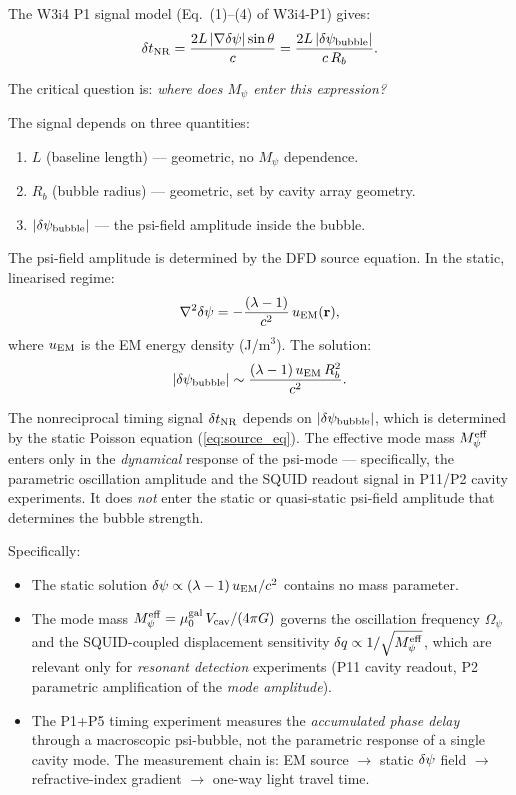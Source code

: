 The W3i4 P1 signal model (Eq.~(1)--(4) of W3i4-P1) gives:
\begin{equation}
\delta t_{\rm NR} = \frac{2L\,|\nabla\delta\psi|\sin\theta}{c}
= \frac{2L\,|\delta\psi_{\rm bubble}|}{c\,R_b}.
\label{eq:signal_recap}
\end{equation}

The critical question is: \emph{where does $M_\psi$ enter this expression?}

The signal depends on three quantities:
\begin{enumerate}[nosep]
\item $L$ (baseline length) --- geometric, no $M_\psi$ dependence.
\item $R_b$ (bubble radius) --- geometric, set by cavity array geometry.
\item $|\delta\psi_{\rm bubble}|$ --- the psi-field amplitude inside the bubble.
\end{enumerate}

The psi-field amplitude is determined by the DFD source equation. In the
static, linearised regime:
\begin{equation}
\nabla^2 \delta\psi = -\frac{(\lambda - 1)}{c^2}\,u_{\rm EM}(\mathbf{r}),
\label{eq:source_eq}
\end{equation}
where $u_{\rm EM}$ is the EM energy density (J/m$^3$). The solution:
\begin{equation}
|\delta\psi_{\rm bubble}| \sim \frac{(\lambda - 1)\,u_{\rm EM}\,R_b^2}{c^2}.
\label{eq:dpsi_from_source}
\end{equation}

\begin{theorem}
\label{thm:mpsi_absent}
The nonreciprocal timing signal $\delta t_{\rm NR}$ depends on
$|\delta\psi_{\rm bubble}|$, which is determined by the static Poisson equation
(\ref{eq:source_eq}). The effective mode mass $M_\psi^{\rm eff}$ enters only in the
\emph{dynamical} response of the psi-mode --- specifically, the parametric
oscillation amplitude and the SQUID readout signal in P11/P2 cavity
experiments. It does \emph{not} enter the static or quasi-static psi-field
amplitude that determines the bubble strength.

Specifically:
\begin{itemize}[nosep]
\item The static solution $\delta\psi \propto (\lambda-1)\,u_{\rm EM}/c^2$ contains
  no mass parameter.
\item The mode mass $M_\psi^{\rm eff} = \mu_0^{\rm gal}\,V_{\rm cav}/(4\pi G)$ governs
  the oscillation frequency $\Omega_\psi$ and the SQUID-coupled displacement
  sensitivity $\delta q \propto 1/\sqrt{M_\psi^{\rm eff}}$, which are relevant only
  for \emph{resonant detection} experiments (P11 cavity readout, P2
  parametric amplification of the \emph{mode amplitude}).
\item The P1+P5 timing experiment measures the \emph{accumulated phase delay}
  through a macroscopic psi-bubble, not the parametric response of a single
  cavity mode. The measurement chain is: EM source $\to$ static $\delta\psi$ field
  $\to$ refractive-index gradient $\to$ one-way light travel time.
\end{itemize}
\end{theorem}


